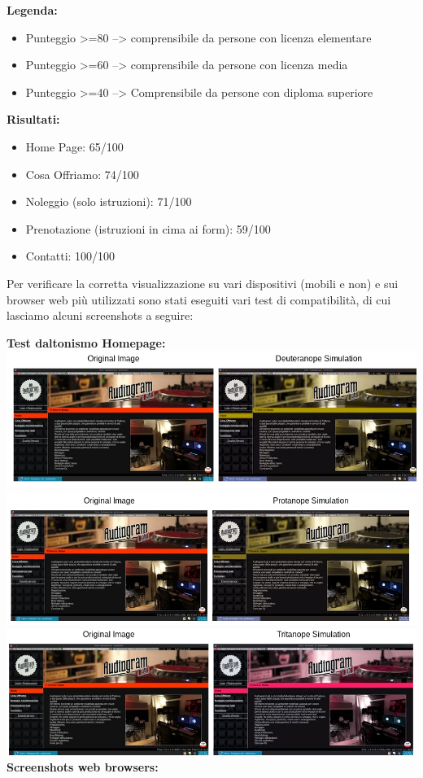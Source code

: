 \begin{framed}
\begin{center}
\textbf{Legenda:} 
\begin{itemize}
\item Punteggio >=80 --> comprensibile da persone con licenza elementare
\item Punteggio >=60 --> comprensibile da persone con licenza media
\item Punteggio >=40 --> Comprensibile da persone con diploma superiore
\end{itemize}
\textbf{Risultati:}
\begin{itemize}
\item Home Page: 65/100
\item Cosa Offriamo: 74/100
\item Noleggio (solo istruzioni): 71/100
\item Prenotazione (istruzioni in cima ai form): 59/100
\item Contatti: 100/100
\end{itemize}
\end{center}
\end{framed}

\pagebreak

Per verificare la corretta visualizzazione su vari dispositivi (mobili e non) e sui browser web più utilizzati sono stati eseguiti vari test di compatibilità, di cui lasciamo alcuni screenshots a seguire:

\begin{center}
\textbf{Test daltonismo Homepage:}
\includegraphics[scale=0.5]{Images/Dalton1.png}
\includegraphics[scale=0.5]{Images/Dalton2.png}
\includegraphics[scale=0.5]{Images/Dalton3.png}
\textbf{Screenshots web browsers: }
\end{center}
